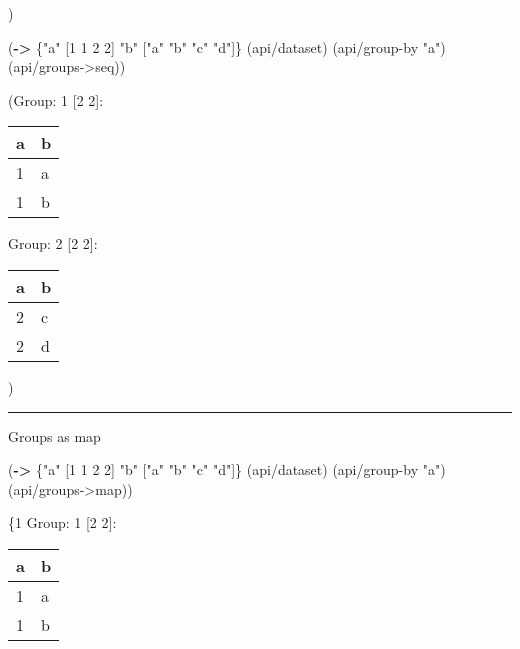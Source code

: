 \documentclass[]{article}
\newenvironment{Shaded}{\begin{snugshade}}{\end{snugshade}}
\newcommand{\KeywordTok}[1]{\textcolor[rgb]{0.13,0.29,0.53}{\textbf{#1}}}
\newcommand{\DecValTok}[1]{\textcolor[rgb]{0.00,0.00,0.81}{#1}}
\newcommand{\StringTok}[1]{\textcolor[rgb]{0.31,0.60,0.02}{#1}}
\newcommand{\NormalTok}[1]{#1}
\begin{document}
)

\begin{Shaded}
\begin{Highlighting}[]
\NormalTok{(}\KeywordTok{->}\NormalTok{ \{}\StringTok{"a"}\NormalTok{ [}\DecValTok{1} \DecValTok{1} \DecValTok{2} \DecValTok{2}\NormalTok{]}
     \StringTok{"b"}\NormalTok{ [}\StringTok{"a"} \StringTok{"b"} \StringTok{"c"} \StringTok{"d"}\NormalTok{]\}}
\NormalTok{    (api/dataset)}
\NormalTok{    (api/group-by }\StringTok{"a"}\NormalTok{)}
\NormalTok{    (api/groups->seq))}
\end{Highlighting}
\end{Shaded}

(Group: 1 {[}2 2{]}:

\begin{longtable}[]{@{}ll@{}}
\toprule
a & b\tabularnewline
\midrule
\endhead
1 & a\tabularnewline
1 & b\tabularnewline
\bottomrule
\end{longtable}

Group: 2 {[}2 2{]}:

\begin{longtable}[]{@{}ll@{}}
\toprule
a & b\tabularnewline
\midrule
\endhead
2 & c\tabularnewline
2 & d\tabularnewline
\bottomrule
\end{longtable}

)

\begin{center}\rule{0.5\linewidth}{0.5pt}\end{center}

Groups as map

\begin{Shaded}
\begin{Highlighting}[]
\NormalTok{(}\KeywordTok{->}\NormalTok{ \{}\StringTok{"a"}\NormalTok{ [}\DecValTok{1} \DecValTok{1} \DecValTok{2} \DecValTok{2}\NormalTok{]}
     \StringTok{"b"}\NormalTok{ [}\StringTok{"a"} \StringTok{"b"} \StringTok{"c"} \StringTok{"d"}\NormalTok{]\}}
\NormalTok{    (api/dataset)}
\NormalTok{    (api/group-by }\StringTok{"a"}\NormalTok{)}
\NormalTok{    (api/groups->map))}
\end{Highlighting}
\end{Shaded}

\{1 Group: 1 {[}2 2{]}:

\begin{longtable}[]{@{}ll@{}}
\toprule
a & b\tabularnewline
\midrule
\endhead
1 & a\tabularnewline
1 & b\tabularnewline
\bottomrule
\end{longtable}
\end{document}
